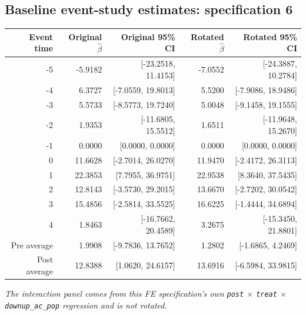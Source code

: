 \documentclass[10pt]{article}
\begin{document}
\subsection*{Baseline event-study estimates: specification 6}
\begin{center}
\scriptsize
\begin{tabular}{r rr rr}
\toprule
Event time & Original $\hat\beta$ & Original 95\% CI & Rotated $\hat\beta$ & Rotated 95\% CI \\
\midrule
-5 & -5.9182 & [-23.2518, 11.4153] & -7.0552 & [-24.3887, 10.2784] \\
-4 & 6.3727 & [-7.0559, 19.8013] & 5.5200 & [-7.9086, 18.9486] \\
-3 & 5.5733 & [-8.5773, 19.7240] & 5.0048 & [-9.1458, 19.1555] \\
-2 & 1.9353 & [-11.6805, 15.5512] & 1.6511 & [-11.9648, 15.2670] \\
-1 & 0.0000 & [0.0000, 0.0000] & 0.0000 & [0.0000, 0.0000] \\
0 & 11.6628 & [-2.7014, 26.0270] & 11.9470 & [-2.4172, 26.3113] \\
1 & 22.3853 & [7.7955, 36.9751] & 22.9538 & [8.3640, 37.5435] \\
2 & 12.8143 & [-3.5730, 29.2015] & 13.6670 & [-2.7202, 30.0542] \\
3 & 15.4856 & [-2.5814, 33.5525] & 16.6225 & [-1.4444, 34.6894] \\
4 & 1.8463 & [-16.7662, 20.4589] & 3.2675 & [-15.3450, 21.8801] \\
\midrule
Pre average & 1.9908 & [-9.7836, 13.7652] & 1.2802 & [-1.6865, 4.2469] \\
Post average & 12.8388 & [1.0620, 24.6157] & 13.6916 & [-6.5984, 33.9815] \\
\bottomrule
\end{tabular}
\end{center}
\medskip
\textit{The interaction panel comes from this FE specification's own \texttt{post} $\times$ \texttt{treat} $\times$ \texttt{downup\_ac\_pop} regression and is not rotated.}
\clearpage
\end{document}
